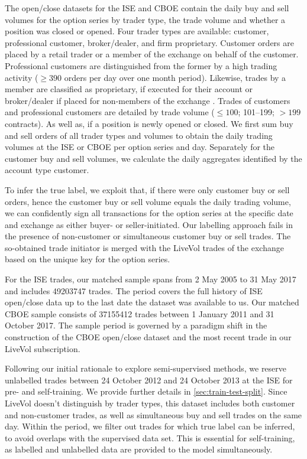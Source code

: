 The open/close datasets for the \gls{ISE} and \gls{CBOE} contain the daily buy and sell volumes for the option series by trader type, the trade volume and whether a position was closed or opened. Four trader types are available: customer, professional customer, broker/dealer, and firm proprietary. Customer orders are placed by a retail trader or a member of the exchange on behalf of the customer. Professional customers are distinguished from the former by a high trading activity ($\geq390$ orders per day over one month period). Likewise, trades by a member are classified as proprietary, if executed for their account or broker/dealer if placed for non-members of the exchange \autocite[][2]{nasdaqincFrequentlyAskedQuestions2017}. Trades of customers and professional customers are detailed by trade volume ($\leq 100$; 101--199; $> 199$ contracts). As well as, if a position is newly opened or closed. We first sum buy and sell orders of all trader types and volumes to obtain the daily trading volumes at the \gls{ISE} or \gls{CBOE} per option series and day. Separately for the customer buy and sell volumes, we calculate the daily aggregates identified by the account type customer.

To infer the true label, we exploit that, if there were only customer buy or sell orders, hence the customer buy or sell volume equals the daily trading volume, we can confidently sign all transactions for the option series at the specific date and exchange as either buyer- or seller-initiated. Our labelling approach fails in the presence of non-customer or simultaneous customer buy or sell trades. The so-obtained trade initiator is merged with the LiveVol trades of the exchange based on the unique key for the option series.

For the \gls{ISE} trades, our matched sample spans from 2 May 2005 to 31 May 2017 and includes \num{49203747} trades. The period covers the full history of \gls{ISE} open/close data up to the last date the dataset was available to us. Our matched \gls{CBOE} sample consists of \num{37155412} trades between 1 January 2011 and 31 October 2017. The sample period is governed by a paradigm shift in the construction of the \gls{CBOE} open/close dataset and the most recent trade in our LiveVol subscription.

Following our initial rationale to explore semi-supervised methods, we reserve unlabelled trades between 24 October 2012 and 24 October 2013 at the \gls{ISE} for pre- and self-training. We provide further details in \cref{sec:train-test-split}. Since LiveVol doesn't distinguish by trader types, this dataset includes both customer and non-customer trades, as well as simultaneous buy and sell trades on the same day. Within the period, we filter out trades for which true label can be inferred, to avoid overlaps with the supervised data set. This is essential for self-training, as labelled and unlabelled data are provided to the model simultaneously.


